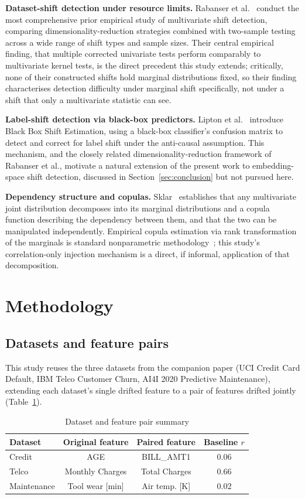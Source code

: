 \documentclass[conference]{IEEEtran}
\begin{document}
\textbf{Dataset-shift detection under resource limits.} Rabanser et al.~\cite{rabanser2019} conduct the most comprehensive prior empirical study of multivariate shift detection, comparing dimensionality-reduction strategies combined with two-sample testing across a wide range of shift types and sample sizes. Their central empirical finding, that multiple corrected univariate tests perform comparably to multivariate kernel tests, is the direct precedent this study extends; critically, none of their constructed shifts hold marginal distributions fixed, so their finding characterises detection difficulty under marginal shift specifically, not under a shift that only a multivariate statistic can see.

\textbf{Label-shift detection via black-box predictors.} Lipton et al.~\cite{lipton2018} introduce Black Box Shift Estimation, using a black-box classifier's confusion matrix to detect and correct for label shift under the anti-causal assumption. This mechanism, and the closely related dimensionality-reduction framework of Rabanser et al., motivate a natural extension of the present work to embedding-space shift detection, discussed in Section~\ref{sec:conclusion} but not pursued here.

\textbf{Dependency structure and copulas.} Sklar~\cite{sklar1959} establishes that any multivariate joint distribution decomposes into its marginal distributions and a copula function describing the dependency between them, and that the two can be manipulated independently. Empirical copula estimation via rank transformation of the marginals is standard nonparametric methodology~\cite{nelsen2006}; this study's correlation-only injection mechanism is a direct, if informal, application of that decomposition.

\section{Methodology}

\subsection{Datasets and feature pairs}

This study reuses the three datasets from the companion paper (UCI Credit Card Default, IBM Telco Customer Churn, AI4I 2020 Predictive Maintenance), extending each dataset's single drifted feature to a pair of features drifted jointly (Table~\ref{tab:pairs}).

\begin{table}[htbp]
\caption{Dataset and feature pair summary}
\label{tab:pairs}
\centering
\small
\begin{tabular}{lccc}
\toprule
Dataset & Original feature & Paired feature & Baseline $r$ \\
\midrule
Credit      & AGE              & BILL\_AMT1        & 0.06 \\
Telco       & Monthly Charges  & Total Charges     & 0.66 \\
Maintenance & Tool wear [min]  & Air temp. [K]     & 0.02 \\
\bottomrule
\end{tabular}
\end{table}
\end{document}
